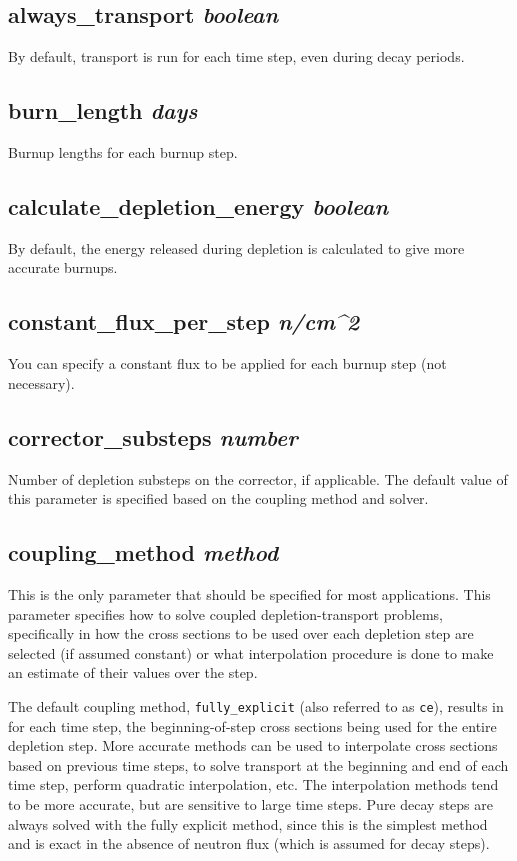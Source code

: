 \documentclass[10pt]{article}
\begin{document}
\subsection{always\_transport \textit{boolean}}
By default, transport is run for each time step, even during decay periods. 

\subsection{burn\_length \textit{days}}
Burnup lengths for each burnup step. 

\subsection{calculate\_depletion\_energy \textit{boolean}}
By default, the energy released during depletion is calculated to give more accurate burnups.

\subsection{constant\_flux\_per\_step \textit{n/cm^2}}
You can specify a constant flux to be applied for each burnup step (not necessary).

\subsection{corrector\_substeps \textit{number}}
Number of depletion substeps on the corrector, if applicable. The default value of this parameter is specified based on the coupling method and solver. 

\subsection{coupling\_method \textit{method}}
This is the only parameter that should be specified for most applications. This parameter specifies how to solve coupled depletion-transport problems, specifically in how the cross sections to be used over each depletion step are selected (if assumed constant) or what interpolation procedure is done to make an estimate of their values over the step.

The default coupling method, \texttt{fully\_explicit} (also referred to as \texttt{ce}), results in for each time step, the beginning-of-step cross sections being used for the entire depletion step. More accurate methods can be used to interpolate cross sections based on previous time steps, to solve transport at the beginning and end of each time step, perform quadratic interpolation, etc. The interpolation methods tend to be more accurate, but are sensitive to large time steps. Pure decay steps are always solved with the fully explicit method, since this is the simplest method and is exact in the absence of neutron flux (which is assumed for decay steps).
\end{document}

